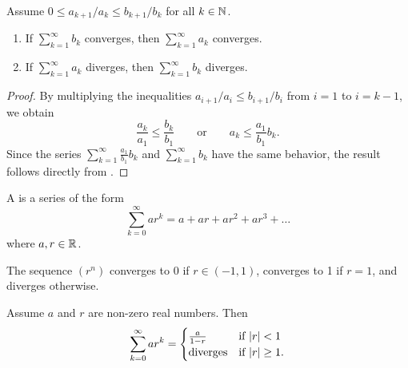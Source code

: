 \begin{proposition}
  Assume $0 \leq a_{k + 1}/a_k \leq b_{k + 1}/b_k$ for all $k \in \mathbb N$.
  \begin{enumerate}
    \item If $\sum_{k = 1}^{\infty} b_k$ converges, then $\sum_{k =
      1}^{\infty} a_k$ converges.
    \item If $\sum_{k = 1}^{\infty} a_k$ diverges, then $\sum_{k =
      1}^{\infty} b_k$ diverges.
  \end{enumerate}
\end{proposition}

\begin{proof}
  By multiplying the inequalities $a_{i + 1}/a_i \leq b_{i + 1}/b_i$
  from $i = 1$ to $i = k - 1$, we obtain
  \[ \frac{a_k}{a_1} \leq \frac{b_k}{b_1} \qquad \text{or} \qquad
  a_k \leq \frac{a_1}{b_1} b_k. \]
  Since the series $\sum_{k = 1}^{\infty} \frac{a_1}{b_1} b_k$ and
  $\sum_{k = 1}^{\infty} b_k$ have the same behavior, the result
  follows directly from .
\end{proof}

\begin{definition}
  A  is a series of the form
  \[ \sum_{k = 0}^{\infty} ar^k = a + ar + ar^2 + ar^3 + \dots \]
  where $a, r \in \mathbb R$.
\end{definition}

\begin{lemma}
  The sequence $(r^n)$ converges to 0 if $r \in (-1, 1)$, converges
  to 1 if $r = 1$, and diverges otherwise.
\end{lemma}

\begin{proposition}
  Assume $a$ and $r$ are non-zero real numbers. Then
  \begin{align*}
    \sum_{k = 0}^{\infty} ar^k =
    \begin{cases}
      \frac{a}{1 - r} & \text{if $| r | < 1$} \\
      \text{diverges} & \text{if $| r | \geq 1$}.
    \end{cases}
  \end{align*}
\end{proposition}

